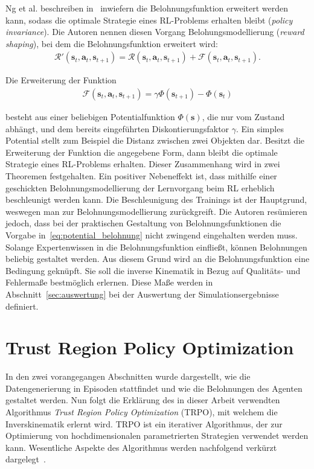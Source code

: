 Ng et al. beschreiben in~\cite{NHR99} inwiefern die Belohnungsfunktion erweitert werden kann, sodass die optimale Strategie eines RL-Problems erhalten bleibt (\textit{policy invariance}). Die Autoren nennen diesen Vorgang Belohungsmodellierung (\textit{reward shaping}), bei dem die Belohnungsfunktion erweitert wird:
\begin{align}
\mathcal{R}'(\bm{s}_t, \bm{a}_t, \bm{s}_{t+1}) = \mathcal{R}(\bm{s}_t, \bm{a}_t, \bm{s}_{t+1})
+ \mathcal{F}(\bm{s}_t, \bm{a}_t, \bm{s}_{t+1}).
\label{eq:reward_shaping}
\end{align}

Die Erweiterung der Funktion 
\begin{align}
\mathcal{F}(\bm{s}_t, \bm{a}_t, \bm{s}_{t+1}) = \gamma \Phi(\bm{s}_{t+1}) - \Phi(\bm{s}_t)
\label{eq:potential_belohnung}
\end{align}

besteht aus einer beliebigen Potentialfunktion $\Phi(\bm{s})$, die nur vom Zustand abhängt, und dem bereits eingeführten Diskontierungsfaktor $\gamma$. Ein simples Potential stellt zum Beispiel die Distanz zwischen zwei Objekten dar. Besitzt die Erweiterung der Funktion die angegebene Form, dann bleibt die optimale Strategie eines RL-Problems erhalten. Dieser Zusammenhang wird in zwei Theoremen festgehalten. Ein positiver Nebeneffekt ist, dass mithilfe einer geschickten Belohnungsmodellierung der Lernvorgang beim RL erheblich beschleunigt werden kann. Die Beschleunigung des Trainings ist der Hauptgrund, weswegen man zur Belohnungsmodellierung zurückgreift. Die Autoren resümieren jedoch, dass bei der praktischen Gestaltung von Belohnungsfunktionen die Vorgabe in~\eqref{eq:potential_belohnung} nicht zwingend eingehalten werden muss. Solange Expertenwissen in die Belohnungsfunktion einfließt, können Belohnungen beliebig gestaltet werden. Aus diesem Grund wird an die Belohnungsfunktion eine Bedingung geknüpft. Sie soll die inverse Kinematik in Bezug auf Qualitäts- und Fehlermaße bestmöglich erlernen. Diese Maße werden in Abschnitt~\ref{sec:auswertung} bei der Auswertung der Simulationsergebnisse definiert. 






\section{Trust Region Policy Optimization}
\label{sec:TRPO}

In den zwei vorangegangen Abschnitten wurde dargestellt, wie die Datengenerierung in Episoden stattfindet und wie die Belohnungen des Agenten gestaltet werden. Nun folgt die Erklärung des in dieser Arbeit verwendten Algorithmus \textit{Trust Region Policy Optimization} (TRPO), mit welchem die Inverskinematik erlernt wird. TRPO ist ein iterativer Algorithmus, der zur Optimierung von hochdimensionalen parametrierten Strategien verwendet werden kann. Wesentliche Aspekte des Algorithmus werden nachfolgend verkürzt dargelegt~\cite{SLM+15}. \newline

